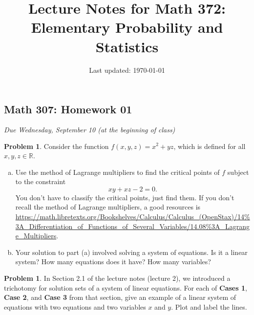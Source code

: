 \documentclass[10pt]{article}
\title{Lecture Notes for Math 372: \\Elementary Probability and Statistics}
\date{Last updated: \today}
\theoremstyle{definition}
\newtheorem{problem}[theorem]{Problem}
\newcommand{\1}[1]{\textbf{1}_{\left[#1\right]}} %
\def\R{\mathbb{R}} %
\begin{document}
\begin{center}
  \section*{Math 307: Homework 01}
  \textit{Due Wednesday, September 10 (at the beginning of class)}
\end{center}


\begin{problem}%
  Consider the function $f(x,y,z) = x^{2}+yz$, which is defined for all
  $x,y,z\in \R$.
  \begin{enumerate}[(a)]
    \item Use the method of Lagrange multipliers to find
    the critical points of $f$ subject to the constraint
    \begin{equation*}
      xy+xz-2=0.
    \end{equation*}
    You don't have to classify the critical points, just find them. If you
    don't recall the method of Lagrange multipliers, a good resources is
    \url{https://math.libretexts.org/Bookshelves/Calculus/Calculus_(OpenStax)/14%3A_Differentiation_of_Functions_of_Several_Variables/14.08%3A_Lagrange_Multipliers}.
    
    \item Your solution to part (a) involved solving a system of equations. Is
    it a linear system? How many equations does it have? How many variables?
   
  \end{enumerate}
\end{problem}

\begin{problem}
  In Section 2.1 of the lecture notes (lecture 2), we introduced a trichotomy
  for solution sets of a system of linear equations. For each of \textbf{Cases
    1}, \textbf{Case 2}, and \textbf{Case 3} from that section, give an
  example of a linear system of equations with two equations and two variables
  $x$ and $y$. Plot and label the lines.
\end{problem}
\end{document}
